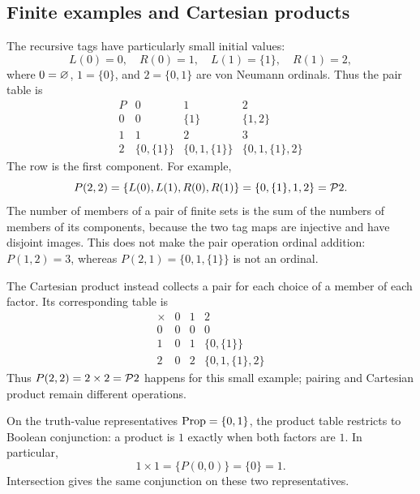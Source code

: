 \subsection{Finite examples and Cartesian products}
The recursive tags have particularly small initial values:
\[
L(0)=0,\quad R(0)=1,\quad L(1)=\{1\},\quad R(1)=2,
\]
where $0=\varnothing$, $1=\{0\}$, and $2=\{0,1\}$ are von Neumann
ordinals. Thus the pair table is
\[
\begin{array}{c|ccc}
P & 0 & 1 & 2\\\hline
0 & 0 & \{1\} & \{1,2\}\\
1 & 1 & 2 & 3\\
2 & \{0,\{1\}\} & \{0,1,\{1\}\} & \{0,1,\{1\},2\}
\end{array}
\]
The row is the first component. For example,
\[
P(2,2)=\{L(0),L(1),R(0),R(1)\}
      =\{0,\{1\},1,2\}=\mathcal{P} 2.
\]
The number of members of a pair of finite sets is the sum of the numbers
of members of its components, because the two tag maps are injective and
have disjoint images. This does not make the pair operation ordinal
addition: $P(1,2)=3$, whereas $P(2,1)=\{0,1,\{1\}\}$ is not an ordinal.

The Cartesian product instead collects a pair for each choice of a member
of each factor. Its corresponding table is
\[
\begin{array}{c|ccc}
\times & 0 & 1 & 2\\\hline
0 & 0 & 0 & 0\\
1 & 0 & 1 & \{0,\{1\}\}\\
2 & 0 & 2 & \{0,1,\{1\},2\}
\end{array}
\]
Thus $P(2,2)=2\times2=\mathcal{P}2$ happens for this small example; pairing
and Cartesian product remain different operations.

On the truth-value representatives $\mathrm{Prop}=\{0,1\}$, the product table
restricts to Boolean conjunction: a product is $1$ exactly when both
factors are $1$. In particular,
\[
1\times1=\{P(0,0)\}=\{0\}=1.
\]
Intersection gives the same conjunction on these two representatives.


